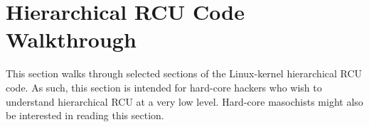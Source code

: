 









\section{Hierarchical RCU Code Walkthrough}
\label{app:rcuimpl:rcutreewt:Hierarchical RCU Code Walkthrough}

This section walks through selected sections of the Linux-kernel
hierarchical RCU code.
As such, this section is intended for hard-core hackers who wish
to understand hierarchical RCU at a very low level.
Hard-core masochists might also be interested in reading this section.

